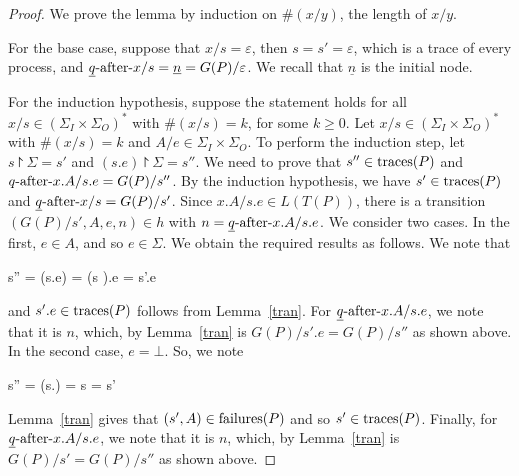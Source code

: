 \begin{proof}
  We prove the lemma by induction on $\#(x/y)$, the length of $x/y$.

  For the base case, suppose that $x/s = \varepsilon$, then $s = s' = \varepsilon$,
  which is a trace of every process, and $\underline q\text{-after-} x/s = \underline
  n = G(P)/{\varepsilon }$. We recall that $\underline n$ is the initial node.


  For the induction hypothesis, suppose the statement holds for all $x/s \in
  (\Sigma_I\times\Sigma_O)^*$ with $\#(x/s)=k$, for some $k\ge 0$. Let
  $x/s\in (\Sigma_I\times\Sigma_O)^*$ with $\#(x/s)=k$ and $A/e\in
  \Sigma_I\times \Sigma_O$. To perform the induction step, let $s\project
  \Sigma=s'$ and $(s.e) \project \Sigma=s''$. We need to prove that $s'' \in
  \text{traces}(P)$ and $q\text{-after-} x.A/s.e = G(P)/s''$. By the induction hypothesis, we
  have $s'\in\text{traces}(P)$ and $\underline q\text{-after-} x/s=G(P)/s'$. Since $x.A/s.e\in
  L(T(P))$, there is a transition $(G(P)/s',A,e,n)\in h$ with $n=\underline
  q\text{-after-} x.A/s.e$. We consider two cases. In
  the first, $e \in A$, and so $e \in \Sigma$. We obtain the required results
  as follows. We note that
  \begin{argue}
    s'' = (s.e) \project \Sigma = (s \project \Sigma).e = s'.e
  \end{argue}
  and $s'.e \in \text{traces}(P)$ follows from Lemma~\ref{tran}. For $\underline q\text{-after-}
  x.A/s.e$, we note that it is $n$, which, by Lemma~\ref{tran} is $G(P)/s'.e
  = G(P)/s''$ as shown above. In the second case, $e = \bot$. So, we note
  \begin{argue}
    s'' = (s.\bot) \project \Sigma = s \project \Sigma = s'
  \end{argue}
  Lemma~\ref{tran} gives that $(s',A) \in {\text {\rm failures}}(P)$ and so $s' \in
  \text{traces}(P)$. Finally, for $\underline q\text{-after-} x.A/s.e$, we note that it is $n$, which, by
  Lemma~\ref{tran} is $G(P)/s' = G(P)/s''$ as shown above.
\end{proof}
